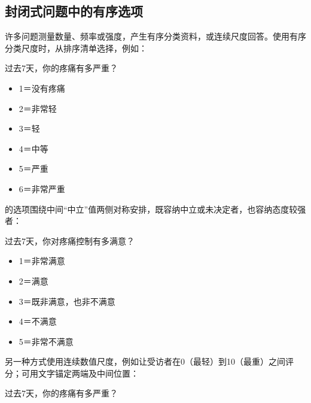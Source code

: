\subsection{封闭式问题中的有序选项}
许多问题测量数量、频率或强度，产生有序分类资料，或连续尺度回答。使用有序分类尺度时，从排序清单选择，例如：
\begin{bookbox}{过去7天，你的疼痛有多严重？}
\begin{itemize}[label=$\circ$]
\item 1＝没有疼痛\item 2＝非常轻\item 3＝轻\item 4＝中等\item 5＝严重\item 6＝非常严重
\end{itemize}
\end{bookbox}
的选项围绕中间“中立”值两侧对称安排，既容纳中立或未决定者，也容纳态度较强者：
\begin{bookbox}{过去7天，你对疼痛控制有多满意？}
\begin{itemize}[label=$\circ$]
\item 1＝非常满意\item 2＝满意\item 3＝既非满意，也非不满意\item 4＝不满意\item 5＝非常不满意
\end{itemize}
\end{bookbox}
另一种方式使用连续数值尺度，例如让受访者在0（最轻）到10（最重）之间评分；可用文字锚定两端及中间位置：
\begin{bookbox}{过去7天，你的疼痛有多严重？}
\centering
{}
\end{bookbox}
